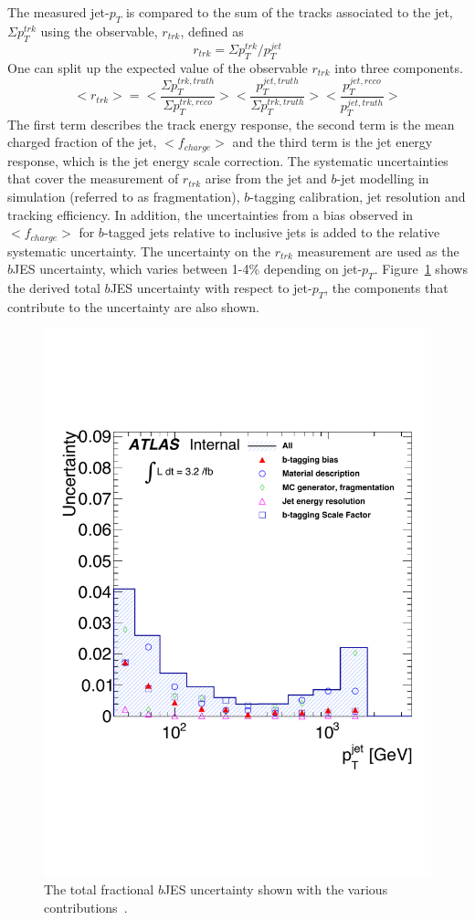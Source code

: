 The measured jet-$p_T$ is compared to the sum of the tracks associated to the jet, $\Sigma p_T^{trk}$
using the observable, $r_{trk}$, defined as
\begin{equation} 
  r_{trk} = \Sigma p_{T}^{trk}/p_{T}^{jet}
\end{equation}
One can split up the expected value of the observable $r_{trk}$ into three components.
\begin{equation} 
  <r_{trk}> = <\frac{\Sigma p_{T}^{trk,truth}}{\Sigma p_{T}^{trk,reco}}> <\frac{p_{T}^{jet,truth}}{\Sigma p_{T}^{trk,truth}}> <\frac{p_{T}^{jet,reco}}{p_{T}^{jet,truth}}> 
\end{equation}
The first term describes the track energy response, the second term is the mean charged fraction of the jet, $<f_{charge}>$ and 
the third term is the jet energy response, which is the jet energy scale correction. 
The systematic uncertainties that cover the measurement of $r_{trk}$
arise from the jet and $b$-jet modelling in simulation (referred to as fragmentation),
$b$-tagging calibration, jet resolution and tracking efficiency.
In addition, the uncertainties from a bias observed in $<f_{charge}>$ for $b$-tagged jets relative to inclusive jets is added to the relative systematic uncertainty.
The uncertainty on the $r_{trk}$ measurement are used as the $b$JES uncertainty, which varies between 1-4\% depending on jet-$p_T$.
Figure~\ref{fig:obj-bjets_bJES_uncert} shows the derived total $b$JES uncertainty with respect to jet-$p_T$,
the components that contribute to the uncertainty are also shown.

\begin{figure}[!ht]
  \captionsetup[subfigure]{aboveskip=-5pt,justification=centering}
  \begin{center}
    \includegraphics[width=0.6\linewidth, angle=0]{figs/Objects/bjets_bJES_uncert_edit.pdf}
  \end{center}
  \caption[The total fractional $b$JES uncertainty shown with the various contributions.]
          {The total fractional $b$JES uncertainty shown with the various contributions~\cite{dibjet-int_mori16}.}
          \label{fig:obj-bjets_bJES_uncert}
\end{figure}

